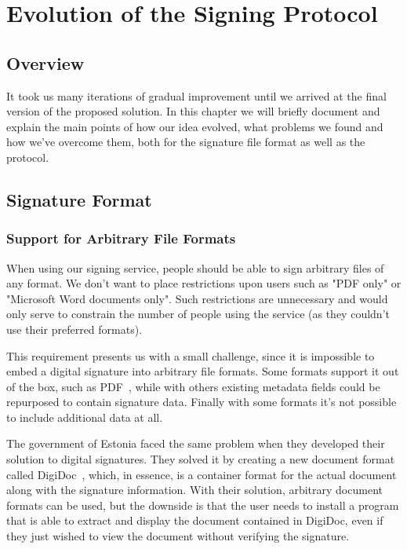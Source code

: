 \chapter{Evolution of the Signing Protocol}
\label{ch:signingprotocol}

\section{Overview}\label{sec:overview}
It took us many iterations of gradual improvement until we arrived at the final version of the proposed solution.
In this chapter we will briefly document and explain the main points of how our idea evolved,
what problems we found and how we've overcome them,
both for the signature file format as well as the protocol.

\section{Signature Format}
\label{sec:signatureformat}

\subsection{Support for Arbitrary File Formats}\label{subsec:support-for-arbitrary-file-formats}

When using our signing service, people should be able to sign arbitrary files of any format.
We don't want to place restrictions upon users such as "\gls{PDF} only" or "Microsoft Word documents only".
Such restrictions are unnecessary and would only serve to constrain the number of people using the service
(as they couldn't use their preferred formats).

This requirement presents us with a small challenge,
since it is impossible to embed a digital signature into arbitrary file formats.
Some formats support it out of the box, such as \gls{PDF}~\cite{etsipades},
while with others existing metadata fields could be repurposed to contain signature data.
Finally with some formats it's not possible to include additional data at all.

The government of Estonia faced the same problem when they developed their solution to digital signatures.
They solved it by creating a new document format called DigiDoc~\cite{digidoc},
which, in essence, is a container format for the actual document along with the signature information.
With their solution, arbitrary document formats can be used,
but the downside is that the user needs to install a program that is able to extract and display the document contained in DigiDoc,
even if they just wished to view the document without verifying the signature.

